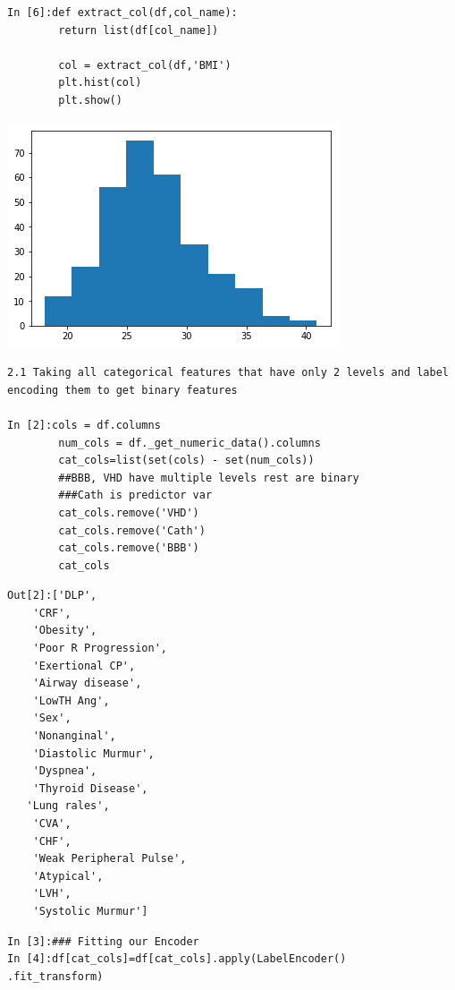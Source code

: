 \documentclass[sigconf]{acmart}
\begin{document}
\begin{lstlisting}
In [6]:def extract_col(df,col_name):
        return list(df[col_name])

        col = extract_col(df,'BMI') 
        plt.hist(col)
        plt.show()
\end{lstlisting}
\includegraphics[width=0.95\columnwidth]{images/output_2_0.png}

\begin{lstlisting}
2.1 Taking all categorical features that have only 2 levels and label encoding them to get binary features

In [2]:cols = df.columns
        num_cols = df._get_numeric_data().columns
        cat_cols=list(set(cols) - set(num_cols))
        ##BBB, VHD have multiple levels rest are binary
        ###Cath is predictor var
        cat_cols.remove('VHD')
        cat_cols.remove('Cath')
        cat_cols.remove('BBB')
        cat_cols
\end{lstlisting}

\begin{lstlisting}
Out[2]:['DLP',
    'CRF',
    'Obesity',
    'Poor R Progression',
    'Exertional CP',
    'Airway disease',
    'LowTH Ang',
    'Sex',
    'Nonanginal',
    'Diastolic Murmur',
    'Dyspnea',
    'Thyroid Disease',
   'Lung rales',
    'CVA',
    'CHF',
    'Weak Peripheral Pulse',
    'Atypical',
    'LVH',
    'Systolic Murmur']
\end{lstlisting}

\begin{lstlisting}
In [3]:### Fitting our Encoder
In [4]:df[cat_cols]=df[cat_cols].apply(LabelEncoder()
.fit_transform)
\end{lstlisting}
\end{document}
